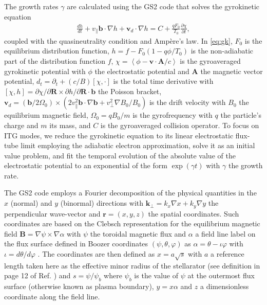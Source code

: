 \documentclass[prl,twocolumn,amsmath,amssymb,showpacs,superscriptaddress]{revtex4-2}
\begin{document}
The growth rates $\gamma$ are calculated using the GS2 code \cite{Kotschenreuther1995,Dorland2000a,Baumgaertel2011} that solves the gyrokinetic equation
%
\begin{align}
    \frac{d h}{d t}+v_\parallel \mathbf b \cdot \nabla h + \mathbf v_d \cdot \nabla h = C + \frac{q F_0}{T_0}\frac{\partial \chi}{\partial t},
\label{eq:gk}
\end{align}
%
coupled with the quasineutrality condition and Ampère's law.
%
In \cref{eq:gk}, $F_0$ is the equilibrium distribution function, $h=f-F_0(1-q \phi/T_0)$ is the non-adiabatic part of the distribution function $f$, $\chi=\left<\phi - \mathbf v \cdot \mathbf A/c\right>$ is the gyroaveraged gyrokinetic potential with $\phi$ the electrostatic potential and $\mathbf A$ the magnetic vector potential, $d_t=\partial_t + (c/B)[\chi, \cdot]$ is the total time derivative with $[\chi,h]=\partial \chi/\partial \mathbf R \times \partial h/\partial \mathbf R \cdot \mathbf b$ the Poisson bracket, $\mathbf v_d = (\mathbf b / 2\Omega_0)\times(2v_\parallel^2 \mathbf b \cdot \nabla \mathbf b + v_\perp^2 \nabla B_0/B_0)$ is the drift velocity with $B_0$ the equilibrium magnetic field, $\Omega_0=q B_0/m$ is the gyrofrequency with $q$ the particle's charge and $m$ its mass, and $C$ is the gyroaveraged collision operator.
%
To focus on ITG modes, we reduce the gyrokinetic equation to its linear electrostatic flux-tube limit employing the adiabatic electron approximation, solve it as an initial value problem, and fit the temporal evolution of the absolute value of the electrostatic potential to an exponential of the form $\exp(\gamma t)$ with $\gamma$ the growth rate.

The GS2 {code employs} a Fourier decomposition of the physical quantities in the $x$ (normal) and $y$ (binormal) directions with $\mathbf k_\perp = k_x \nabla x + k_y \nabla y$ the perpendicular wave-vector and $\mathbf r = (x,y,z)$ the spatial coordinates.
%
Such coordinates are based on the Clebsch representation for the equilibrium magnetic field $\mathbf B = \nabla \psi \times \nabla \alpha$ with $\psi$ the toroidal magnetic flux and $\alpha$ a field line label on the flux surface {defined in Boozer coordinates $(\psi,\theta,\varphi)$ as $\alpha=\theta-\iota \varphi$} with $\iota=d\theta/d\varphi$ \cite{Helander2014}.
%
The coordinates are then defined as $x=a \sqrt{s}$ with $a$ a reference length taken here as the effective minor radius of the stellarator (see definition in page 12 of Ref. \cite{Landreman2019b}) and $s=\psi/\psi_b$ where $\psi_b$ is the value of $\psi$ at the outermost flux surface (otherwise known as plasma boundary), $y=x \alpha$ and $z$ a dimensionless coordinate along the field line.
\end{document}
